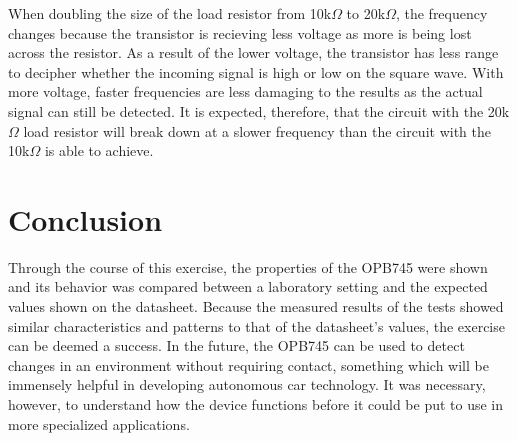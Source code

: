 \documentclass[conference]{IEEEtran}
\begin{document}
When doubling the size of the load resistor from 10k$\Omega$  to 20k$\Omega$, the frequency changes because the transistor is recieving
less voltage as more is being lost across the resistor. As a result of the lower voltage, the transistor has less range to decipher
whether the incoming signal is high or low on the square wave. With more voltage, faster frequencies are less damaging to the results as
the actual signal can still be detected. It is expected, therefore, that the circuit with the 20k$\Omega$ load resistor will break down
at a slower frequency than the circuit with the 10k$\Omega$ is able to achieve.

\section{Conclusion}
Through the course of this exercise, the properties of the OPB745 were shown and its behavior was compared between a laboratory
setting and the expected values shown on the datasheet. Because the measured results of the tests showed similar characteristics and
patterns to that of the datasheet's values, the exercise can be deemed a success. In the future, the OPB745 can be used to detect changes
in an environment without requiring contact, something which will be immensely helpful in developing autonomous car technology. It was
necessary, however, to understand how the device functions before it could be put to use in more specialized applications.
\end{document}
